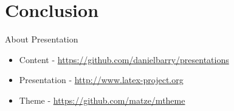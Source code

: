 \documentclass{beamer}
\begin{document}
  \section{Conclusion}
  \begin{frame}{About Presentation}
    \begin{itemize}
      \item Content - \url{https://github.com/danielbarry/presentations}
      \item Presentation - \url{http://www.latex-project.org}
      \item Theme - \url{https://github.com/matze/mtheme}
    \end{itemize}
  \end{frame}
\end{document}
